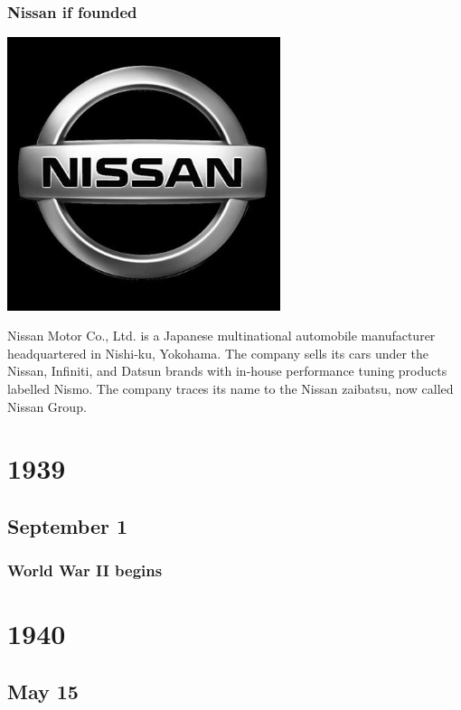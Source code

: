 \documentclass[11pt]{report}
\begin{document}
\subsection{Nissan if founded}
\vspace{2mm}\begin{center}\includegraphics[width=8cm]{./img/nissan.jpg}\end{center}
Nissan Motor Co., Ltd. is a Japanese multinational automobile manufacturer headquartered in Nishi-ku, Yokohama. The company sells its cars under the Nissan, Infiniti, and Datsun brands with in-house performance tuning products labelled Nismo. The company traces its name to the Nissan zaibatsu, now called Nissan Group.

\chapter{1939}
\section{September 1}
\subsection{World War II begins}

\chapter{1940}
\section{May 15}
\end{document}
